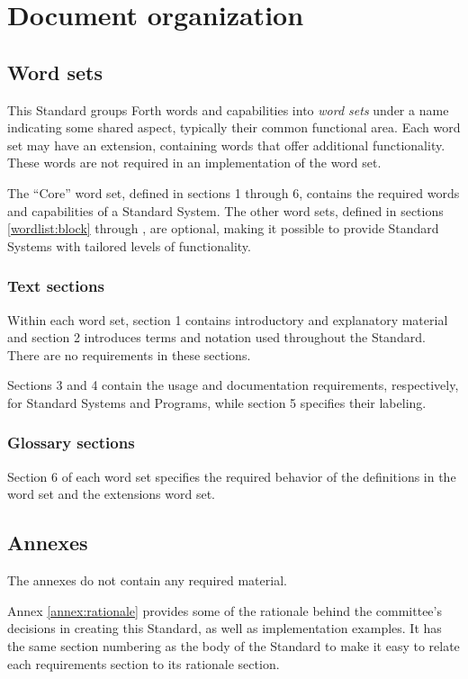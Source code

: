 \section{Document organization}
\label{intro:wordsets}

\subsection{Word sets}
This Standard groups Forth words and capabilities into \emph{word sets}
under a name indicating some shared aspect, typically their common
functional area. Each word set may have an extension, containing words
that offer additional functionality. These words are not required in an
implementation of the word set.

The ``Core'' word set, defined in sections 1 through 6, contains the
required words and capabilities of a Standard System. The other word
sets, defined in sections \ref{wordlist:block} through
, are optional, making it possible to provide
Standard Systems with tailored levels of functionality.

\subsubsection{Text sections}

Within each word set, section 1 contains introductory and explanatory
material and section 2 introduces terms and notation used throughout
the Standard. There are no requirements in these sections.

Sections 3 and 4 contain the usage and documentation requirements,
respectively, for Standard Systems and Programs, while section 5
specifies their labeling.

\subsubsection{Glossary sections}

Section 6 of each word set specifies the required behavior of the
definitions in the word set and the extensions word set.

\subsection{Annexes}

The annexes do not contain any required material.

Annex \ref{annex:rationale} provides some of the rationale behind the
committee's decisions in creating this Standard, as well as
implementation examples. It has the same section numbering as the
body of the Standard to make it easy to relate each requirements
section to its rationale section.

